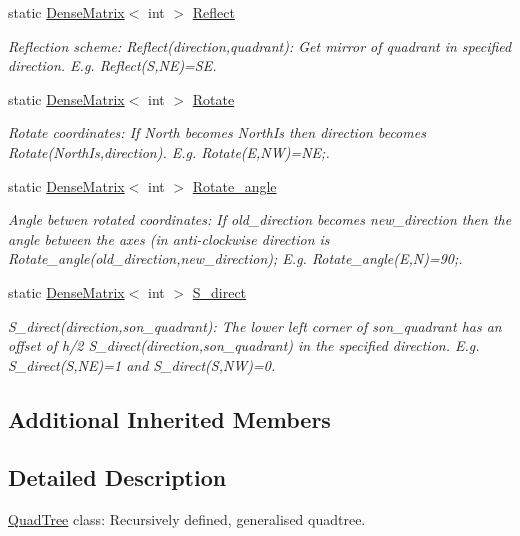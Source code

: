\begin{DoxyCompactItemize}
static \hyperlink{classoomph_1_1DenseMatrix}{Dense\+Matrix}$<$ int $>$ \hyperlink{classoomph_1_1QuadTree_a445a7130050bd7084f49acac8afc1530}{Reflect}
\begin{DoxyCompactList}\small\item\em Reflection scheme\+: Reflect(direction,quadrant)\+: Get mirror of quadrant in specified direction. E.\+g. Reflect(\+S,\+N\+E)=SE. \end{DoxyCompactList}\item 
static \hyperlink{classoomph_1_1DenseMatrix}{Dense\+Matrix}$<$ int $>$ \hyperlink{classoomph_1_1QuadTree_a55ea0e64281aef7e8f8b521ec3b0a956}{Rotate}
\begin{DoxyCompactList}\small\item\em Rotate coordinates\+: If North becomes North\+Is then direction becomes Rotate(\+North\+Is,direction). E.\+g. Rotate(\+E,\+N\+W)=NE;. \end{DoxyCompactList}\item 
static \hyperlink{classoomph_1_1DenseMatrix}{Dense\+Matrix}$<$ int $>$ \hyperlink{classoomph_1_1QuadTree_afb9b79dcbde1c8e1ab6fad62688b8224}{Rotate\+\_\+angle}
\begin{DoxyCompactList}\small\item\em Angle betwen rotated coordinates\+: If old\+\_\+direction becomes new\+\_\+direction then the angle between the axes (in anti-\/clockwise direction is Rotate\+\_\+angle(old\+\_\+direction,new\+\_\+direction); E.\+g. Rotate\+\_\+angle(\+E,\+N)=90;. \end{DoxyCompactList}\item 
static \hyperlink{classoomph_1_1DenseMatrix}{Dense\+Matrix}$<$ int $>$ \hyperlink{classoomph_1_1QuadTree_aa63584c3432487cd6c965c92e09ce8d3}{S\+\_\+direct}
\begin{DoxyCompactList}\small\item\em S\+\_\+direct(direction,son\+\_\+quadrant)\+: The lower left corner of son\+\_\+quadrant has an offset of h/2 S\+\_\+direct(direction,son\+\_\+quadrant) in the specified direction. E.\+g. S\+\_\+direct(\+S,\+N\+E)=1 and S\+\_\+direct(\+S,\+N\+W)=0. \end{DoxyCompactList}\end{DoxyCompactItemize}
\subsection*{Additional Inherited Members}


\subsection{Detailed Description}
\hyperlink{classoomph_1_1QuadTree}{Quad\+Tree} class\+: Recursively defined, generalised quadtree.

